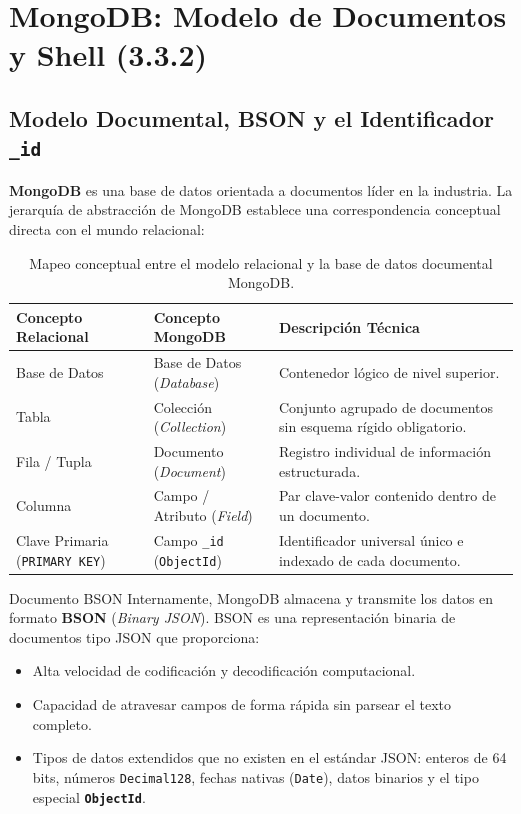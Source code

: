 \section{MongoDB: Modelo de Documentos y Shell (3.3.2)}

\subsection{Modelo Documental, BSON y el Identificador \texttt{\_id}}

\textbf{MongoDB} es una base de datos orientada a documentos líder en la industria. La jerarquía de abstracción de MongoDB establece una correspondencia conceptual directa con el mundo relacional:

\begin{table}[htbp]
\centering
\small
\begin{tabularx}{\textwidth}{p{3.8cm} p{4.2cm} X}
\toprule
\textbf{Concepto Relacional} & \textbf{Concepto MongoDB} & \textbf{Descripción Técnica} \\
\midrule
Base de Datos & Base de Datos (\emph{Database}) & Contenedor lógico de nivel superior. \\
Tabla & Colección (\emph{Collection}) & Conjunto agrupado de documentos sin esquema rígido obligatorio. \\
Fila / Tupla & Documento (\emph{Document}) & Registro individual de información estructurada. \\
Columna & Campo / Atributo (\emph{Field}) & Par clave-valor contenido dentro de un documento. \\
Clave Primaria (\texttt{PRIMARY KEY}) & Campo \texttt{\_id} (\texttt{ObjectId}) & Identificador universal único e indexado de cada documento. \\
\bottomrule
\end{tabularx}
\caption{Mapeo conceptual entre el modelo relacional y la base de datos documental MongoDB.}
\label{tab:relacional-vs-mongo}
\end{table}

\begin{definicion}{Documento BSON}
Internamente, MongoDB almacena y transmite los datos en formato \textbf{BSON} (\emph{Binary JSON}). BSON es una representación binaria de documentos tipo JSON que proporciona:
\begin{itemize}
    \item Alta velocidad de codificación y decodificación computacional.
    \item Capacidad de atravesar campos de forma rápida sin parsear el texto completo.
    \item Tipos de datos extendidos que no existen en el estándar JSON: enteros de 64 bits, números \texttt{Decimal128}, fechas nativas (\texttt{Date}), datos binarios y el tipo especial \textbf{\texttt{ObjectId}}.
\end{itemize}
\end{definicion}

